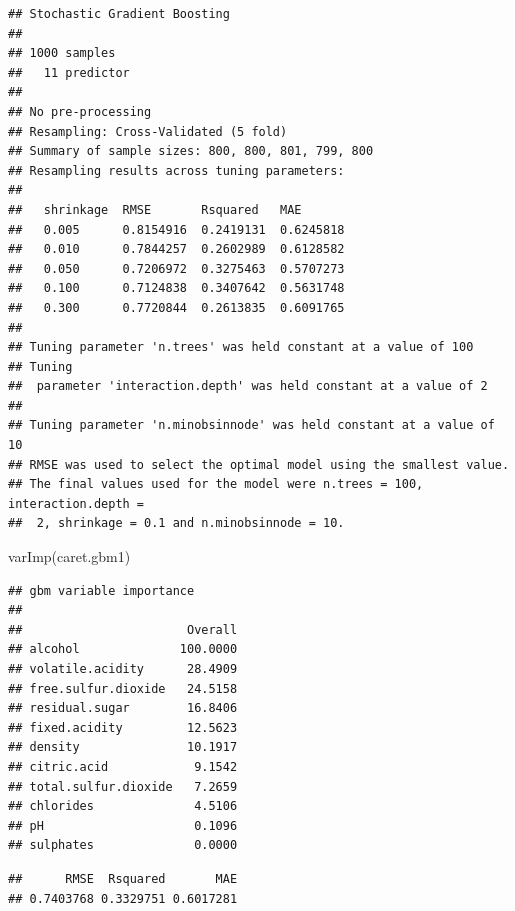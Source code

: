 \documentclass[
  spanish,
]{book}
\newenvironment{Shaded}{\begin{snugshade}}{\end{snugshade}}
\newcommand{\AttributeTok}[1]{\textcolor[rgb]{0.77,0.63,0.00}{#1}}
\newcommand{\FunctionTok}[1]{\textcolor[rgb]{0.00,0.00,0.00}{#1}}
\newcommand{\NormalTok}[1]{#1}
\newcommand{\SpecialCharTok}[1]{\textcolor[rgb]{0.00,0.00,0.00}{#1}}
\theoremstyle{break}
\theoremstyle{definition}
\theoremstyle{definition}
\theoremstyle{definition}
\theoremstyle{definition}
\theoremstyle{remark}
\begin{document}
\begin{verbatim}
## Stochastic Gradient Boosting 
## 
## 1000 samples
##   11 predictor
## 
## No pre-processing
## Resampling: Cross-Validated (5 fold) 
## Summary of sample sizes: 800, 800, 801, 799, 800 
## Resampling results across tuning parameters:
## 
##   shrinkage  RMSE       Rsquared   MAE      
##   0.005      0.8154916  0.2419131  0.6245818
##   0.010      0.7844257  0.2602989  0.6128582
##   0.050      0.7206972  0.3275463  0.5707273
##   0.100      0.7124838  0.3407642  0.5631748
##   0.300      0.7720844  0.2613835  0.6091765
## 
## Tuning parameter 'n.trees' was held constant at a value of 100
## Tuning
##  parameter 'interaction.depth' was held constant at a value of 2
## 
## Tuning parameter 'n.minobsinnode' was held constant at a value of 10
## RMSE was used to select the optimal model using the smallest value.
## The final values used for the model were n.trees = 100, interaction.depth =
##  2, shrinkage = 0.1 and n.minobsinnode = 10.
\end{verbatim}

\begin{Shaded}
\begin{Highlighting}[]
\FunctionTok{varImp}\NormalTok{(caret.gbm1)}
\end{Highlighting}
\end{Shaded}

\begin{verbatim}
## gbm variable importance
## 
##                       Overall
## alcohol              100.0000
## volatile.acidity      28.4909
## free.sulfur.dioxide   24.5158
## residual.sugar        16.8406
## fixed.acidity         12.5623
## density               10.1917
## citric.acid            9.1542
## total.sulfur.dioxide   7.2659
## chlorides              4.5106
## pH                     0.1096
## sulphates              0.0000
\end{verbatim}

\begin{Shaded}
\end{Shaded}

\begin{verbatim}
##      RMSE  Rsquared       MAE 
## 0.7403768 0.3329751 0.6017281
\end{verbatim}
\end{document}
